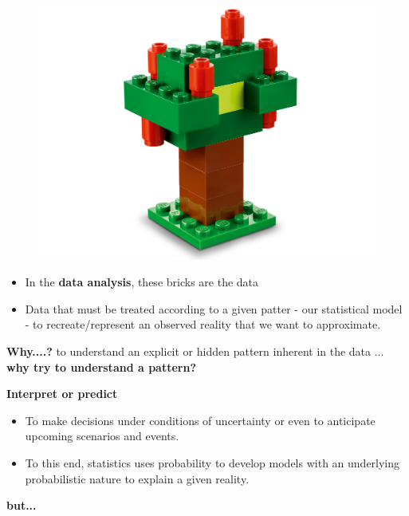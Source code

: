 \documentclass[12pt]{beamer}
\begin{document}
\begin{frame}
	\begin{figure}
		\centering
		\includegraphics[width=.8\linewidth]{lego1}
	\end{figure}
\end{frame}


\begin{frame}
\begin{itemize}
	
	\item In the \textbf{data analysis}, these bricks are the data
	\item Data that must be treated according to a given patter - our statistical model - to recreate/represent an observed reality that we want to approximate.
\end{itemize}

\textbf{Why....?}
 to understand an explicit or hidden pattern inherent in the data  ... \textbf{why try to understand a pattern?}
	
\end{frame}

\begin{frame}
\textbf{Interpret or predict}
\begin{itemize}
 \item To make decisions under conditions of uncertainty or even to anticipate upcoming scenarios and events.
 
 \item To this end, statistics uses probability to develop models with an underlying probabilistic nature to explain a given reality.
 
\end{itemize}

\textbf{but...}
\end{frame}
\end{document}
